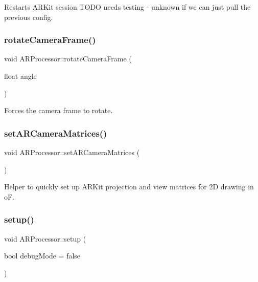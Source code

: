 Restarts A\+R\+Kit session T\+O\+DO needs testing -\/ unknown if we can just pull the previous config. \mbox{\label{class_a_r_processor_a2514281144c680e13c02562c74746ceb}} 
\subsubsection{\texorpdfstring{rotate\+Camera\+Frame()}{rotateCameraFrame()}}
{\footnotesize\ttfamily void A\+R\+Processor\+::rotate\+Camera\+Frame (\begin{DoxyParamCaption}\item[{float}]{angle }\end{DoxyParamCaption})}



Forces the camera frame to rotate. 

\mbox{\label{class_a_r_processor_a2ffd8b9518388be29eba6affe4d4d152}} 
\subsubsection{\texorpdfstring{set\+A\+R\+Camera\+Matrices()}{setARCameraMatrices()}}
{\footnotesize\ttfamily void A\+R\+Processor\+::set\+A\+R\+Camera\+Matrices (\begin{DoxyParamCaption}{ }\end{DoxyParamCaption})}



Helper to quickly set up A\+R\+Kit projection and view matrices for 2D drawing in oF. 

\mbox{\label{class_a_r_processor_a1a41547daccb7c6810bc2693ea6d5487}} 
\subsubsection{\texorpdfstring{setup()}{setup()}}
{\footnotesize\ttfamily void A\+R\+Processor\+::setup (\begin{DoxyParamCaption}\item[{bool}]{debug\+Mode = {\ttfamily false} }\end{DoxyParamCaption})}



